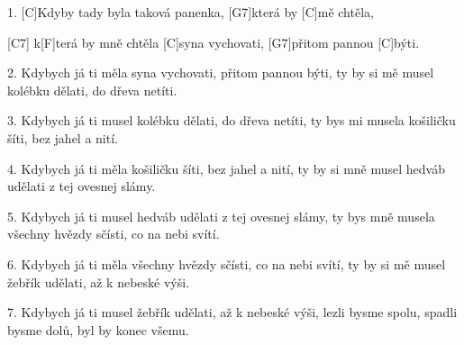 
1. [C]Kdyby tady byla taková panenka,
[G7]která by [C]mě chtěla,

[C7] k[F]terá by mně chtěla [C]syna vychovati,
[G7]přitom pannou [C]býti.


2.  Kdybych já ti měla syna vychovati,
přitom pannou býti,
ty by si mě musel kolébku dělati,
do dřeva netíti.

3.  Kdybych já ti musel kolébku dělati,
do dřeva netíti,
ty bys mi musela košiličku šíti,
bez jahel a nití.

4.  Kdybych já ti měla košiličku šíti,
bez jahel a nití,
ty by si mně musel hedváb udělati
z tej ovesnej slámy.

5.  Kdybych já ti musel hedváb udělati
z tej ovesnej slámy,
ty bys mně musela všechny hvězdy sčísti,
co na nebi svítí.

6.  Kdybych já ti měla všechny hvězdy sčísti,
co na nebi svítí,
ty by si mě musel žebřík udělati,
až k nebeské výši.

7.  Kdybych já ti musel žebřík udělati,
až k nebeské výši,
lezli bysme spolu, spadli bysme dolů,
byl by konec všemu.
